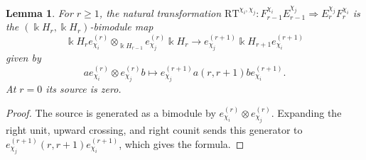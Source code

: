 \documentclass[12pt]{amsart}
\numberwithin{itemcounter}{subsection}
\theoremstyle{plain}
\newtheorem{lemma}[theorem]{Lemma}
\theoremstyle{definition}
\theoremstyle{remark}
\numberwithin{equation}{section}
\def\k{\Bbbk}
\def\Rcross{\mathrm{RT}}
\begin{document}
\begin{lemma}\label{lcrosswreath}
For $r\geq1$, the natural transformation
$\Rcross^{\chi_i,\chi_j}:F^{\chi_i}_{r-1}E^{\chi_j}_{r-1}
\Rightarrow E^{\chi_j}_rF^{\chi_i}_r$ is the $(\k H_r,\k H_r)$-bimodule map
\[
 \k H_r e^{(r)}_{\chi_i}\otimes_{\k H_{r-1}}e^{(r)}_{\chi_j}\k H_r
 \longrightarrow e^{(r+1)}_{\chi_j}\k H_{r+1}e^{(r+1)}_{\chi_i}
\]
given by
\[
 ae^{(r)}_{\chi_i}\otimes e^{(r)}_{\chi_j}b
 \longmapsto e^{(r+1)}_{\chi_j}a(r,r+1)b e^{(r+1)}_{\chi_i}.
\]
At $r=0$ its source is zero.
\end{lemma}
\begin{proof}
The source is generated as a bimodule by
$e^{(r)}_{\chi_i}\otimes e^{(r)}_{\chi_j}$.  Expanding the right unit,
upward crossing, and right counit sends this generator to
$e^{(r+1)}_{\chi_j}(r,r+1)e^{(r+1)}_{\chi_i}$, which gives the formula.
\end{proof}
\end{document}
